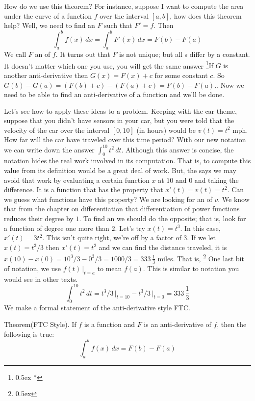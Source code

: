How do we use this theorem? For instance, suppose I want to compute 
the area under the curve of a function $f$ over the interval $[a,b]$, 
how does this theorem help?
Well, we need to find an $F$ such that $F' = f$. Then 
$$
\int_a^b f(x) \, dx = \int_a^b F'(x) \, dx = F(b) - F(a)
$$
We call $F$ an {\it {}\/} of $f$. It turns out that $F$ is not 
unique; but all s differ by a constant.
It doesn't matter 
which one you use, you will get the same answer%
\footnote{\kern 0.5pt \raise 0.5ex \hbox{*}}{If $G$ is another anti-derivative then $G(x) = F(x)+c$ for some constant $c$.
So $G(b) - G(a) =  (F(b) + c) - (F(a) + c) = F(b) - F(a)$.}. Now we need to be 
able to find an anti-derivative of a function and we'll be done.

Let's see how to apply these ideas to a problem. Keeping with the car theme, 
suppose that you didn't have 
sensors in your car, but you were told that the velocity of the car over the 
interval $[0,10]$ (in hours) would be $v(t) =  t^2$ mph. 
How far will the car have
traveled over this time period? With our new notation we can write down the
answer $\int_0^{10} t^2 \, dt$. Although this answer is concise, the
notation hides the real work involved in its computation. That is, to compute
this value from its definition would be a great deal of work.
But, the  says we may avoid that work 
by evaluating a certain  function 
$x$ at $10$ and $0$ and taking the difference. It is a function that has 
the property that $x'(t) = v(t) = t^2$. Can we guess what functions have 
this property? We are looking for an {\it {}\/} of $v$. 
We know that from the chapter on differentiation that  
differentiation of power functions reduces their degree by $1$. To find 
an  we should do the opposite; that is, look for a function 
of degree one more than $2$.
Let's try $x(t) = t^3$. In this case, $x'(t) = 3t^2$. This isn't
quite right, we're off by a factor of $3$. If we let $x(t) = t^3/3$ then 
$x'(t) = t^2$ and we can find the distance traveled, it is 
$x(10) - x(0) = 10^3/3 - 0^3/3 = 1000/3 = 333 \, \frac{1}{3}$ miles.
That is,%
\footnote{\kern 0.5pt \raise 0.5ex \hbox{\dag}}%
{One last bit of notation, we use $f(t)\,\big|_{t=a}$ to mean $f(a)$. This is similar to
notation you would see in other texts.}
$$
\int_0^{10} t^2 \, dt = t^3/3\,\big|_{t=10} - t^3/3\,\big|_{t=0} = 333 \,
\frac{1}{3}
$$
We make a formal statement of the anti-derivative style FTC.

\proclaim Theorem(FTC  Style). If $f$ is a function and 
$F$ is an anti-derivative of $f$, then the following is true:
$$
\int_a^b f(x) \, dx = F(b) - F(a)
$$

